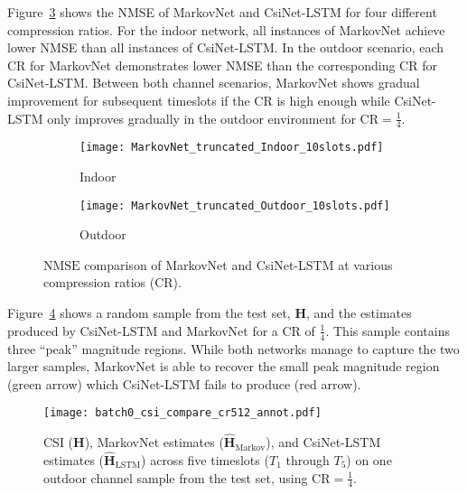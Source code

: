 Figure~\ref{fig:diffnet_result} shows the NMSE of MarkovNet and CsiNet-LSTM for four different compression ratios. For the indoor network, all instances of MarkovNet achieve lower NMSE than all instances of CsiNet-LSTM. In the outdoor scenario, each CR for MarkovNet demonstrates lower NMSE than the corresponding CR for CsiNet-LSTM. Between both channel scenarios, MarkovNet shows gradual improvement for subsequent timeslots if the CR is high enough while CsiNet-LSTM only improves gradually in the outdoor environment for CR$=\frac 14$.
\begin{figure}[!hbtp] \centering 
	\begin{subfigure}[t]{.45\textwidth}
		\centering
		\texttt{[image: MarkovNet\_truncated\_Indoor\_10slots.pdf]}
		\caption{Indoor}
		\label{fig:diffnet_indoor} 
	\end{subfigure}
	\begin{subfigure}[t]{.45\textwidth}
		\centering
		\texttt{[image: MarkovNet\_truncated\_Outdoor\_10slots.pdf]}
		\caption{Outdoor}
		\label{fig:diffnet_outdoor} 
	\end{subfigure}
	\caption{$\text{NMSE}$ comparison of MarkovNet and CsiNet-LSTM 
	at various compression ratios (CR).} 
	\label{fig:diffnet_result} \vspace*{-2mm}
\end{figure}  
Figure~\ref{fig:csi_image} shows a random sample from the test set, $\mathbf H$, and the estimates produced by CsiNet-LSTM and MarkovNet for a CR of $\frac 14$. This sample contains three ``peak'' magnitude regions. While both networks manage to capture the two larger samples, MarkovNet is able to recover the small peak magnitude region ({\color{darkgreen}green arrow}) which CsiNet-LSTM fails to produce ({\color{red}red arrow}).

\begin{figure}[htb] \centering 
	\texttt{[image: batch0\_csi\_compare\_cr512\_annot.pdf]}
	\caption{CSI ($\mathbf H$), MarkovNet estimates ($\hat{\mathbf H}_{\text{Markov}}$), and CsiNet-LSTM estimates ($\hat{\mathbf H}_{\text{LSTM}}$) across five timeslots ($T_1$ through $T_5$) on one outdoor channel sample from the test set,
using $\text{CR}=\frac 14$.} 
	\label{fig:csi_image} 
\end{figure}
